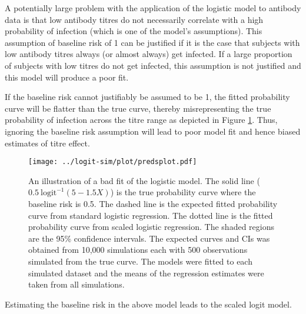 A potentially large problem with the application of the logistic model to antibody data is that low antibody titres do not necessarily correlate with a high probability of infection (which is one of the model's assumptions). This assumption of baseline risk of 1 can be justified if it is the case that subjects with low antibody titres always (or almost always) get infected. If a large proportion of subjects with low titres do not get infected, this assumption is not justified and this model will produce a poor fit.

If the baseline risk cannot justifiably be assumed to be 1, the fitted probability curve will be flatter than the true curve, thereby misrepresenting the true probability of infection across the titre range as depicted in Figure \ref{LogisticFit}. Thus, ignoring the baseline risk assumption will lead to poor model fit and hence biased estimates of titre effect.

\begin{figure}[htp]
	\centering
	\texttt{[image: ../logit-sim/plot/predsplot.pdf]}
	\caption{
		An illustration of a bad fit of the logistic model. The solid line ($0.5\ \text{logit}^{-1}(5 - 1.5 X)$) is the true probability curve where the baseline risk is 0.5. The dashed line is the expected fitted probability curve from standard logistic regression. The dotted line is the fitted probability curve from scaled logistic regression. The shaded regions are the 95\% confidence intervals. The expected curves and CIs was obtained from 10,000 simulations each with 500 observations simulated from the true curve. The models were fitted to each simulated dataset and the means of the regression estimates were taken from all simulations.
	}
	\label{LogisticFit}
\end{figure}

Estimating the baseline risk in the above model leads to the scaled logit model.
